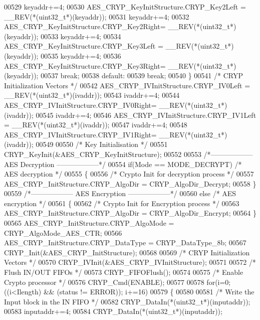 \begin{DoxyCode}
00529     keyaddr+=4;
00530     AES\_CRYP\_KeyInitStructure.CRYP_Key2Left = \_\_REV(*(uint32\_t*)(keyaddr));
00531     keyaddr+=4;
00532     AES\_CRYP\_KeyInitStructure.CRYP_Key2Right= \_\_REV(*(uint32\_t*)(keyaddr));
00533     keyaddr+=4;
00534     AES\_CRYP\_KeyInitStructure.CRYP_Key3Left = \_\_REV(*(uint32\_t*)(keyaddr));
00535     keyaddr+=4;
00536     AES\_CRYP\_KeyInitStructure.CRYP_Key3Right= \_\_REV(*(uint32\_t*)(keyaddr));
00537     \textcolor{keywordflow}{break};
00538     \textcolor{keywordflow}{default}:
00539     \textcolor{keywordflow}{break};
00540   \}
00541   \textcolor{comment}{/* CRYP Initialization Vectors */}
00542   AES\_CRYP\_IVInitStructure.CRYP_IV0Left = \_\_REV(*(uint32\_t*)(ivaddr));
00543   ivaddr+=4;
00544   AES\_CRYP\_IVInitStructure.CRYP_IV0Right= \_\_REV(*(uint32\_t*)(ivaddr));
00545   ivaddr+=4;
00546   AES\_CRYP\_IVInitStructure.CRYP_IV1Left = \_\_REV(*(uint32\_t*)(ivaddr));
00547   ivaddr+=4;
00548   AES\_CRYP\_IVInitStructure.CRYP_IV1Right= \_\_REV(*(uint32\_t*)(ivaddr));
00549 
00550   \textcolor{comment}{/* Key Initialisation */}
00551   CRYP_KeyInit(&AES\_CRYP\_KeyInitStructure);
00552 
00553   \textcolor{comment}{/*------------------ AES Decryption ------------------*/}
00554   \textcolor{keywordflow}{if}(Mode == MODE_DECRYPT) \textcolor{comment}{/* AES decryption */}
00555   \{
00556     \textcolor{comment}{/* Crypto Init for decryption process */}
00557     AES\_CRYP\_InitStructure.CRYP_AlgoDir = CRYP_AlgoDir_Decrypt;
00558   \}
00559   \textcolor{comment}{/*------------------ AES Encryption ------------------*/}
00560   \textcolor{keywordflow}{else} \textcolor{comment}{/* AES encryption */}
00561   \{
00562     \textcolor{comment}{/* Crypto Init for Encryption process */}
00563     AES\_CRYP\_InitStructure.CRYP_AlgoDir = CRYP_AlgoDir_Encrypt;
00564   \}
00565   AES\_CRYP\_InitStructure.CRYP_AlgoMode = CRYP_AlgoMode_AES_CTR;
00566   AES\_CRYP\_InitStructure.CRYP_DataType = CRYP_DataType_8b;
00567   CRYP_Init(&AES\_CRYP\_InitStructure);
00568 
00569   \textcolor{comment}{/* CRYP Initialization Vectors */}
00570   CRYP_IVInit(&AES\_CRYP\_IVInitStructure);
00571 
00572   \textcolor{comment}{/* Flush IN/OUT FIFOs */}
00573   CRYP_FIFOFlush();
00574 
00575   \textcolor{comment}{/* Enable Crypto processor */}
00576   CRYP_Cmd(ENABLE);
00577 
00578   \textcolor{keywordflow}{for}(i=0; ((i<Ilength) && (status != ERROR)); i+=16)
00579   \{
00580 
00581     \textcolor{comment}{/* Write the Input block in the IN FIFO */}
00582     CRYP_DataIn(*(uint32\_t*)(inputaddr));
00583     inputaddr+=4;
00584     CRYP_DataIn(*(uint32\_t*)(inputaddr));

\end{DoxyCode}
